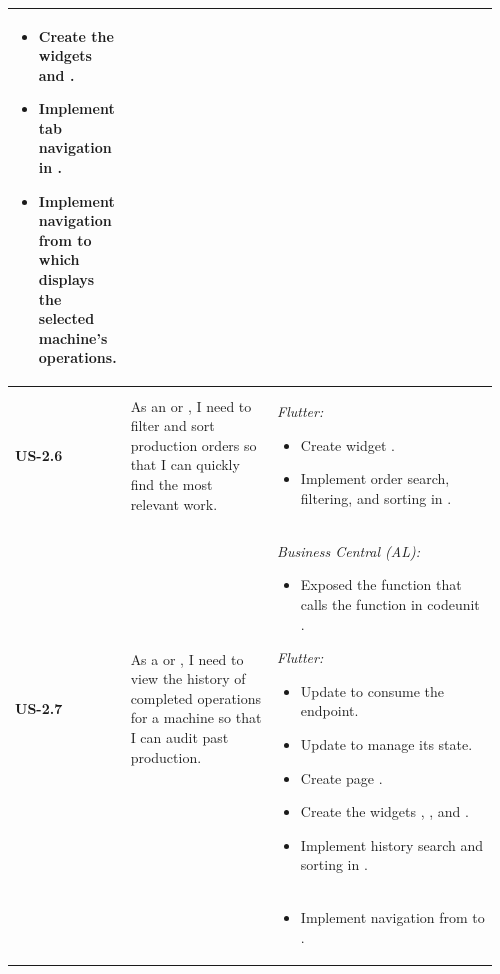 \begin{longtable}{@{} P{0.09\linewidth} P{0.34\linewidth} P{0.53\linewidth} @{}}
\begin{itemize}[nosep, leftmargin=*]
    \item Create the widgets  and .
    \item Implement tab navigation in .
    \item Implement navigation from  to  which displays the selected machine's operations.
  \end{itemize} \\
  \midrule
  \textbf{US-2.6}
  & As an  or , I need to filter and
  sort production orders so that I can quickly find the most relevant work.
  & \noindent\textit{Flutter:}
  \begin{itemize}[nosep, leftmargin=*]
    \item Create widget .
    \item Implement order search, filtering, and sorting in .
  \end{itemize} \\
  \midrule
  \textbf{US-2.7}
  & As a  or , I need to view the
  history of completed operations for a machine so that I can audit past
  production.
  & \noindent\textit{Business Central (AL):}
  \begin{itemize}[nosep, leftmargin=*]
    \item Exposed the function  that 
    calls the function  in
    codeunit .
  \end{itemize}
  \noindent\textit{Flutter:}
  \begin{itemize}[nosep, leftmargin=*]
    \item Update  to consume the  endpoint.
    \item Update  to manage its state.
    \item Create page .
    \item Create the widgets , , and .
    \item Implement history search and sorting in .
  \end{itemize} \\ & &
  \begin{itemize}[nosep, leftmargin=*]
    \item Implement navigation from  to .
  \end{itemize}\\  
\end{longtable}

